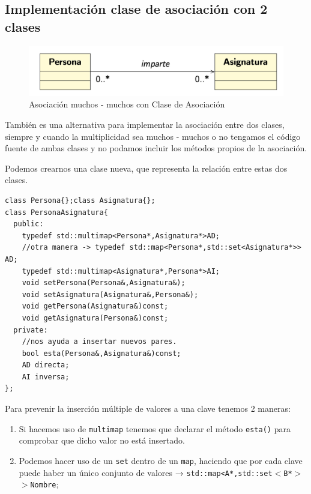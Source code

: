 \subsection{Implementación clase de asociación con 2 clases}

\begin{center}
	\begin{figure}[h]
	\includegraphics[width=\textwidth]{Imagenes/AClS2.png}
	\caption{Asociación muchos - muchos con Clase de Asociación}
\end{figure}
\end{center}
También es una alternativa para implementar la asociación entre dos clases, siempre y cuando la 
multiplicidad sea muchos - muchos o no tengamos el código fuente de ambas clases y no podamos
incluir los métodos propios de la asociación.

Podemos crearnos una clase nueva, que representa la relación entre estas dos clases.
\begin{center}
	\begin{lstlisting}[frame=single]
class Persona{};class Asignatura{};
class PersonaAsignatura{
  public:
    typedef std::multimap<Persona*,Asignatura*>AD;
    //otra manera -> typedef std::map<Persona*,std::set<Asignatura*>> AD;
    typedef std::multimap<Asignatura*,Persona*>AI;
    void setPersona(Persona&,Asignatura&);
    void setAsignatura(Asignatura&,Persona&);
    void getPersona(Asignatura&)const;
    void getAsignatura(Persona&)const;
  private:
    //nos ayuda a insertar nuevos pares.
    bool esta(Persona&,Asignatura&)const;
    AD directa;
    AI inversa;
};
\end{lstlisting}
\end{center}
\newpage
Para prevenir la inserción múltiple de valores a una clave tenemos 2 maneras:
\begin{enumerate}
	\item Si hacemos uso de \texttt{multimap} tenemos que declarar el método \texttt{esta()} para comprobar que dicho valor no está insertado.
	\item Podemos hacer uso de un \texttt {set} dentro de un \texttt{map}, haciendo que por cada clave puede haber un único conjunto de valores → \texttt{std::map<A*,std::set$<$B*$>$$>$Nombre$;$}
\end{enumerate}

